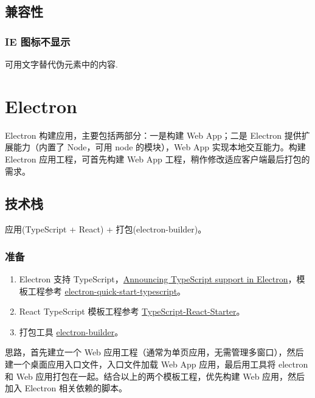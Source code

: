 \subsection{兼容性}\label{ux517cux5bb9ux6027}

\subsubsection{IE 图标不显示}\label{ie-ux56feux6807ux4e0dux663eux793a}

可用文字替代伪元素中的内容.

\section{Electron}\label{electron}

Electron 构建应用，主要包括两部分：一是构建 Web App；二是 Electron
提供扩展能力（内置了 Node，可用 node 的模块），Web App
实现本地交互能力。构建 Electron 应用工程，可首先构建 Web App
工程，稍作修改适应客户端最后打包的需求。

\subsection{技术栈}\label{ux6280ux672fux6808}

应用(TypeScript + React) + 打包(electron-builder)。

\subsubsection{准备}\label{ux51c6ux5907}

\begin{enumerate}
\def\labelenumi{\arabic{enumi}.}
\tightlist
\item
  Electron 支持
  TypeScript，\href{https://electronjs.org/blog/typescript}{Announcing
  TypeScript support in Electron}，模板工程参考
  \href{https://github.com/electron/electron-quick-start-typescript}{electron-quick-start-typescript}。
\item
  React TypeScript 模板工程参考
  \href{https://github.com/Microsoft/TypeScript-React-Starter}{TypeScript-React-Starter}。
\item
  打包工具
  \href{https://github.com/electron-userland/electron-builder}{electron-builder}。
\end{enumerate}

思路，首先建立一个 Web
应用工程（通常为单页应用，无需管理多窗口），然后建一个桌面应用入口文件，入口文件加载
Web App 应用，最后用工具将 electron 和 Web
应用打包在一起。结合以上的两个模板工程，优先构建 Web 应用，然后加入
Electron 相关依赖的脚本。

